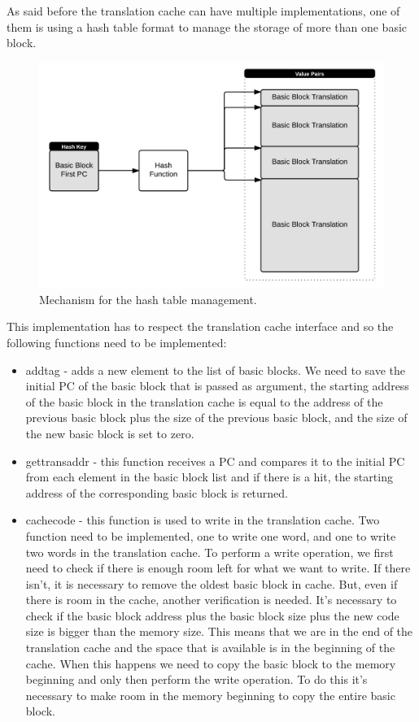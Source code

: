As said before the translation cache can have multiple implementations, one of them is using a hash table format to manage the storage of more than one basic block. 

\begin{figure} [h!]
	\centering
	\includegraphics[scale = 0.2]{images/Hash.png}
	\caption{Mechanism for the hash table management.}
	\label{fig:Hash}
\end{figure}

This implementation has to respect the translation cache interface and so the following functions need to be implemented:
\begin{itemize}
	\item addtag - adds a new element to the list of basic blocks. We need to save the initial PC of the basic block that is passed as argument, the starting address of the basic block in the translation cache is equal to the address of the previous basic block plus the size of the previous basic block, and the size of the new basic block is set to zero.
	\item gettransaddr - this function receives a PC and compares it to the initial PC from each element in the basic block list and if there is a hit, the starting address of the corresponding basic block is returned.
	\item cachecode - this function is used to write in the translation cache. Two function need to be implemented, one to write one word, and one to write two words in the translation cache. To perform a write operation, we first need to check if there is enough room left for what we want to write. If there isn't, it is necessary to remove the oldest basic block in cache. But, even if there is room in the cache, another verification is needed. It's necessary to check if the basic block address plus the basic block size plus the new code size is bigger than the memory size. This means that we are in the end of the translation cache and the space that is available is in the beginning of the cache. When this happens we need to copy the basic block to the memory beginning and only then perform the write operation. To do this it's necessary to make room in the memory beginning to copy the entire basic block.
\end{itemize}
